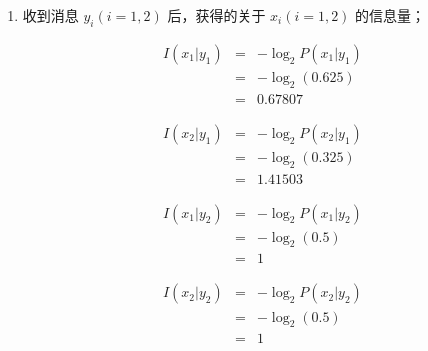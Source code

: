\documentclass[onecolumn,oneside]{BUPTHomework}
\begin{document}
\begin{solution}
{\begin{enumerate}
      \begin{eqnarray} 
        P(x_1 \vert y_2) &=& \frac{P(x_1)P(y_2 \vert x_1)}{\sum_{j=1}^2P(x_j)P(y_2 \vert x_j)} \nonumber \\
        &=& \frac{0.6 \times \frac{1}{6}}{0.6 \times \frac{1}{6} + 0.4 \times \frac{1}{4}} \nonumber \\
        &=& 0.5 \nonumber
      \end{eqnarray}

      \begin{eqnarray} 
        P(x_2 \vert y_2) &=& \frac{P(x_2)P(y_2 \vert x_2)}{\sum_{j=1}^2P(x_j)P(y_2 \vert x_j)} \nonumber \\
        &=& \frac{0.4 \times \frac{1}{4}}{0.6 \times \frac{1}{6} + 0.4 \times \frac{1}{4}} \nonumber \\
        &=& 0.5 \nonumber
      \end{eqnarray}
      
      \item 收到消息 $y_i(i=1,2)$ 后，获得的关于 $x_i(i=1,2)$ 的信息量；
      
      \begin{eqnarray} 
        I(x_1 \vert y_1) &=& -\log_2P(x_1 \vert y_1) \nonumber \\
        &=& -\log_2(0.625) \nonumber \\
        &=& 0.67807 \nonumber
      \end{eqnarray}
      
      \begin{eqnarray} 
        I(x_2 \vert y_1) &=& -\log_2P(x_2 \vert y_1) \nonumber \\
        &=& -\log_2(0.325) \nonumber \\
        &=& 1.41503 \nonumber
      \end{eqnarray}

      \begin{eqnarray} 
        I(x_1 \vert y_2) &=& -\log_2P(x_1 \vert y_2) \nonumber \\
        &=& -\log_2(0.5) \nonumber \\
        &=& 1 \nonumber
      \end{eqnarray}

      \begin{eqnarray} 
        I(x_2 \vert y_2) &=& -\log_2P(x_2 \vert y_2) \nonumber \\
        &=& -\log_2(0.5) \nonumber \\
        &=& 1 \nonumber
      \end{eqnarray}


\end{enumerate}}
\end{solution}
\end{document}
